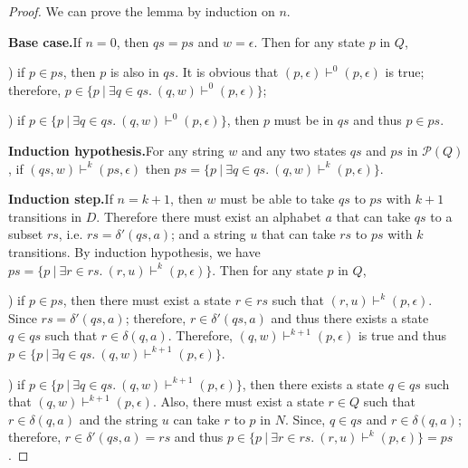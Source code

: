 \begin{proof}
\noindent We can prove the lemma by induction on \(n\). 

\par \noindent \textbf{Base case.}\quad If \(n = 0\), then \(qs = ps\)
and \(w = \epsilon\). Then for any state \(p\) in \(Q\), 
\par {}) if \(p \in ps\), then \(p\) is also in \(qs\). It is obvious that
\((p,\epsilon) \vdash^0 (p, \epsilon)\) is true; therefore, \(p \in
\{p\ |\ \exists q\in qs.\ (q,w) \vdash^0 (p,\epsilon)\}\); 
\par {}) if \(p \in \{p\ |\ \exists q\in qs.\ (q,w) \vdash^0
(p,\epsilon)\}\), then \(p\) must be in \(qs\) and thus \(p \in ps\). 

\par \noindent \textbf{Induction hypothesis.}\quad For any string \(w\) and any
two states \(qs\) and \(ps\) in \(\mathcal P \left({Q}\right)\), if
\((qs,w) \vdash^k (ps,\epsilon)\) then \(ps =
\{p\ |\ \exists q\in qs.\ (q,w) \vdash^k (p,\epsilon)\}\). 

\par \noindent \textbf{Induction step.}\quad If \(n = k + 1\), then
\(w\) must be able to take \(qs\) to \(ps\) with \(k + 1\)
transitions in \(D\). Therefore there must exist an alphabet \(a\)
that can take \(qs\) to a subset \(rs\),
i.e. \(rs = \delta'(qs,a)\); and a string \(u\) that can take \(rs\) to
\(ps\) with \(k\) transitions. By induction hypothesis, we have \(ps =
\{p\ |\ \exists r\in rs.\ (r,u) \vdash^k (p,\epsilon)\}\). Then for any state \(p\) in \(Q\), 

\par {}) if \(p \in ps\), then there must exist a state \(r \in rs\)
such that \((r,u) \vdash^k (p,\epsilon)\). Since \(rs =
\delta'(qs,a)\); therefore, \(r \in \delta'(qs,a)\) and thus there
exists a state \(q \in qs\) such that \(r \in \delta (q,a)\). Therefore,
\((q,w) \vdash^{k+1} (p,\epsilon)\) is true and thus \(p \in \{p\ |\ \exists q\in qs.\ (q,w) \vdash^{k+1}
(p,\epsilon)\}\). 

\par {}) if \(p \in \{p\ |\ \exists q\in qs.\ (q,w) \vdash^{k+1}
(p,\epsilon)\}\), then there exists a state \(q \in qs\) such that \((q,w) \vdash^{k+1}
(p,\epsilon)\). Also, there must exist a state \(r \in Q\) such that
\(r \in \delta (q,a)\) and the string \(u\) can take \(r\) to \(p\) in
\(N\). Since, \(q
\in qs\) and \(r \in \delta (q,a)\); therefore, \(r \in \delta'(qs,a)
= rs\) and thus \(p \in \{p\ |\ \exists r\in rs.\ (r,u) \vdash^k
(p,\epsilon)\} = ps\). 
\end{proof}

